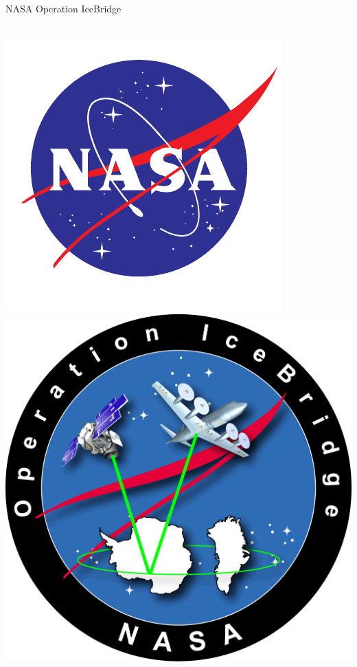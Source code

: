 \documentclass[hide notes,intlimits]{beamer}
\begin{document}
\begin{frame}{NASA Operation IceBridge}
  \vspace{-0.74em}
  \begin{columns}
    \column[c]{2cm}
    \includegraphics[width=\textwidth]{nasa-logo} \\
    \includegraphics[width=\textwidth]{oib}

\end{columns}
\end{frame}
\end{document}
